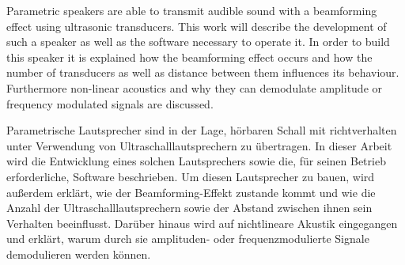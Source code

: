 %

\emptydoublepage \thispagestyle{empty} \vspace*{1cm}

{\hfill\fontfamily{\sfdefault}\bfseries\fontsize{22}{22}\selectfont{Abstract}} \vspace*{1cm}

\noindent
Parametric speakers are able to transmit audible sound with a beamforming effect using ultrasonic transducers. This work will describe the development of such a speaker as well as the software necessary to operate it.\p
In order to build this speaker it is explained how the beamforming effect occurs and how the number of transducers as well as distance between them influences its behaviour. Furthermore non-linear acoustics and why they can demodulate amplitude or frequency modulated signals are discussed.

\emptydoublepage \thispagestyle{empty} \vspace*{1cm}

{\hfill\fontfamily{\sfdefault}\bfseries\fontsize{22}{22}\selectfont{Kurzbeschreibung}} \vspace*{1cm}

\noindent
Parametrische Lautsprecher sind in der Lage, hörbaren Schall mit richtverhalten unter Verwendung von Ultraschalllautsprechern zu übertragen. In dieser Arbeit wird die Entwicklung eines solchen Lautsprechers sowie die, für seinen Betrieb erforderliche, Software beschrieben.\p
Um diesen Lautsprecher zu bauen, wird außerdem erklärt, wie der Beamforming-Effekt zustande kommt und wie die Anzahl der Ultraschalllautsprechern sowie der Abstand zwischen ihnen sein Verhalten beeinflusst. Darüber hinaus wird auf nichtlineare Akustik eingegangen und erklärt, warum durch sie amplituden- oder frequenzmodulierte Signale demodulieren werden können.
